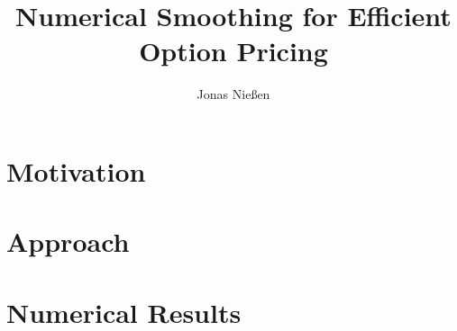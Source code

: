 \documentclass[9pt]{beamer}
\title{Numerical Smoothing for Efficient Option Pricing}
\author{Jonas Nießen} %
\institute[RWTH] %
{
	RWTH Aachen \\ %
}
\date{}
\newcommand{\1}{\mathds{1}}
\begin{document}
	\nocite{*}
	\begin{frame}
		\titlepage %
	\end{frame}
	
	
	\section{Motivation}
	
	\section{Approach}
	
	\section{Numerical Results}
	
	\appendix
	
	
\end{document}
